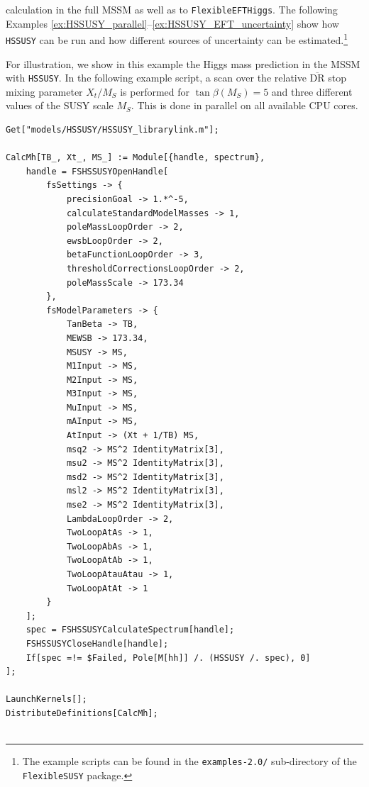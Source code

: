 \documentclass[final,3p,11pt,pdflatex]{elsarticle}
\makeatletter
\newcommand{\modelname}[1]{\texttt{#1}\@\xspace}
\newcommand{\fs}{\texttt{FlexibleSUSY}\@\xspace}
\newcommand{\HSSUSY}{\modelname{HSSUSY}}
\newcommand{\feft}{\texttt{Flex\-ib\-le\-EFT\-Higgs}\@\xspace}
\newcommand{\code}[1]{\lstinline|#1|}  %
\newcommand{\ol}[1]{\overline{#1}}
\newcommand{\DRbar}{\ensuremath{\ol{\text{DR}}}\xspace}
\newcommand{\MS}{\ensuremath{M_S}\xspace}
\makeatother
\begin{document}
calculation in the full MSSM as well as to \feft.  The following
Examples \ref{ex:HSSUSY_parallel}--\ref{ex:HSSUSY_EFT_uncertainty}
show how \HSSUSY can be run and how different sources of uncertainty
can be estimated.\footnote{The example scripts can be found in the
  \code{examples-2.0/} sub-directory of the \fs package.}
%
\begin{example}[label=ex:HSSUSY_parallel]
  For illustration, we show in this example the Higgs mass prediction
  in the MSSM with \HSSUSY.  In the following example script, a scan
  over the relative \DRbar stop mixing parameter $X_t/\MS$ is performed for
  $\tan\beta(\MS) = 5$ and three different values of the SUSY scale $\MS$.
  This is done in parallel on all available CPU cores.
\begin{lstlisting}
Get["models/HSSUSY/HSSUSY_librarylink.m"];

CalcMh[TB_, Xt_, MS_] := Module[{handle, spectrum},
    handle = FSHSSUSYOpenHandle[
        fsSettings -> {
            precisionGoal -> 1.*^-5,
            calculateStandardModelMasses -> 1,
            poleMassLoopOrder -> 2,
            ewsbLoopOrder -> 2,
            betaFunctionLoopOrder -> 3,
            thresholdCorrectionsLoopOrder -> 2,
            poleMassScale -> 173.34
        },
        fsModelParameters -> {
            TanBeta -> TB,
            MEWSB -> 173.34,
            MSUSY -> MS,
            M1Input -> MS,
            M2Input -> MS,
            M3Input -> MS,
            MuInput -> MS,
            mAInput -> MS,
            AtInput -> (Xt + 1/TB) MS,
            msq2 -> MS^2 IdentityMatrix[3],
            msu2 -> MS^2 IdentityMatrix[3],
            msd2 -> MS^2 IdentityMatrix[3],
            msl2 -> MS^2 IdentityMatrix[3],
            mse2 -> MS^2 IdentityMatrix[3],
            LambdaLoopOrder -> 2,
            TwoLoopAtAs -> 1,
            TwoLoopAbAs -> 1,
            TwoLoopAtAb -> 1,
            TwoLoopAtauAtau -> 1,
            TwoLoopAtAt -> 1
        }
    ];
    spec = FSHSSUSYCalculateSpectrum[handle];
    FSHSSUSYCloseHandle[handle];
    If[spec =!= $Failed, Pole[M[hh]] /. (HSSUSY /. spec), 0]
];

LaunchKernels[];
DistributeDefinitions[CalcMh];


\end{lstlisting}
\end{example}
\end{document}
